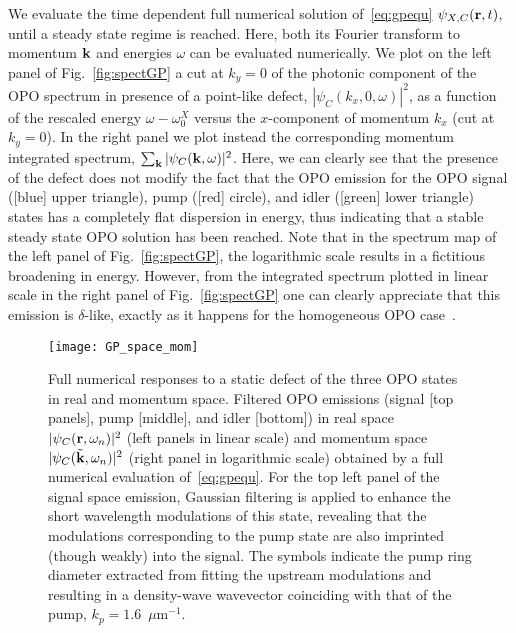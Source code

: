 We evaluate the time dependent full numerical solution
of~\eqref{eq:gpequ} $\psi_{X,C} (\mathbf{r},t)$, until a steady state
regime is reached. Here, both its Fourier transform to momentum
$\mathbf{k}$ and energies $\omega$ can be evaluated numerically.
%
We plot on the left panel of Fig.~\ref{fig:spectGP} a cut at $k_y=0$
of the photonic component of the OPO spectrum in presence of a
point-like defect, $|\psi_C(k_x,0,\omega)|^2$, as a function of the
rescaled energy $\omega - \omega_0^X$ versus the $x$-component of
momentum $k_x$ (cut at $k_y=0$). In the right panel we plot instead
the corresponding momentum integrated spectrum, $\sum_{\mathbf{k}}
|\psi_C(\mathbf{k},\omega)|^2$.
%
Here, we can clearly see that the presence of the defect does not
modify the fact that the OPO emission for the OPO signal ([blue] upper
triangle), pump ([red] circle), and idler ([green] lower triangle)
states has a completely flat dispersion in energy, thus indicating
that a stable steady state OPO solution has been reached. Note that in
the spectrum map of the left panel of Fig.~\ref{fig:spectGP}, the
logarithmic scale results in a fictitious broadening in
energy. However, from the integrated spectrum plotted in linear scale
in the right panel of Fig.~\ref{fig:spectGP} one can clearly appreciate
that this emission is $\delta$-like, exactly as it happens for the
homogeneous OPO case~\cite{9783642241857}.
%
\begin{figure}[tb]
\centering
\texttt{[image: GP\_space\_mom]}
\caption{Full numerical responses to a static defect of
  the three OPO states in real and momentum space. Filtered OPO
  emissions (signal [top panels], pump [middle], and idler [bottom])
  in real space $|\psi_C (\mathbf{r},\omega_n)|^2$ (left panels in
  linear scale) and momentum space $|\psi_C
  (\tilde{\mathbf{k}},\omega_n)|^2$ (right panel in logarithmic scale)
  obtained by a full numerical evaluation of~\eqref{eq:gpequ}. For the
  top left panel of the signal space emission, Gaussian filtering is
  applied to enhance the short wavelength modulations of this state,
  revealing that the modulations corresponding to the pump state are
  also imprinted (though weakly) into the signal. The symbols indicate
  the pump ring diameter extracted from fitting the upstream
  modulations and resulting in a density-wave wavevector coinciding
  with that of the pump, $k_p=1.6$~$\mu$m$^{-1}$.}
\label{fig:numer}
\end{figure}
%
